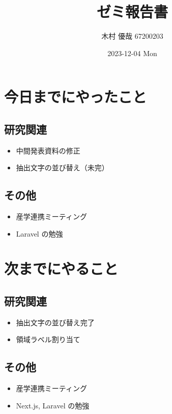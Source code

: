 \documentclass[uplatex, onecolumn, 10pt]{jsarticle}
\begin{document}
\title{\vspace{-40mm}\bf{\LARGE{ゼミ報告書}}}
\author{\vspace{-40mm}木村 優哉 67200203}
\date{2023-12-04 Mon}
\maketitle


\section{今日までにやったこと}

\subsection*{研究関連}
\begin{itemize}
	\item 中間発表資料の修正
	\item 抽出文字の並び替え（未完）
\end{itemize}

\subsection*{その他}
\begin{itemize}
	\item 産学連携ミーティング
	\item Laravel の勉強
\end{itemize}


\section{次までにやること}

\subsection*{研究関連}
\begin{itemize}
	\item 抽出文字の並び替え完了
	\item 領域ラベル割り当て
\end{itemize}

\subsection*{その他}
\begin{itemize}
	\item 産学連携ミーティング
	\item Next.js, Laravel の勉強
\end{itemize}
\end{document}
